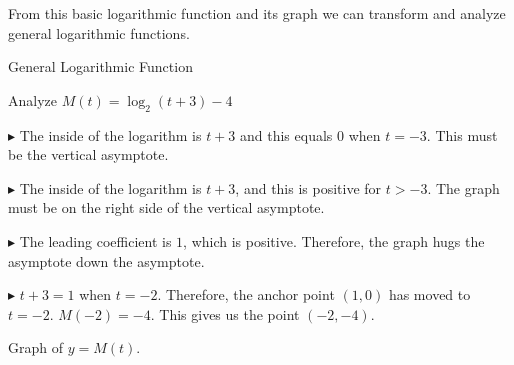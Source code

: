 \documentclass{ximera}
\begin{document}
From this basic logarithmic function and its graph we can transform and analyze general logarithmic functions.
















\begin{example}  General Logarithmic Function



Analyze   $M(t) = \log_2(t+3) - 4$ \\


\begin{explanation}

$\blacktriangleright$ The inside of the logarithm is $t+3$ and this equals $0$ when $t=-3$.  This must be the vertical asymptote.

$\blacktriangleright$ The inside of the logarithm is $t+3$, and this is positive for $t>-3$.  The graph must be on the right side of the vertical asymptote.

$\blacktriangleright$ The leading coefficient is $1$, which is positive.  Therefore, the graph hugs the asymptote down the asymptote. 

$\blacktriangleright$ $t+3=1$ when $t=-2$. Therefore, the anchor point $(1,0)$ has moved to $t = -2$.  $M(-2) = -4$.  This gives us the point $(-2, -4)$.





Graph of $y = M(t)$.

\begin{image}
\end{image}
\end{explanation}
\end{example}
\end{document}
